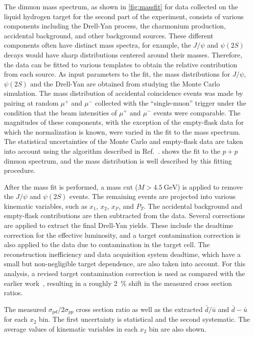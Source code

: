 \documentclass[reprint,aps,unsortedaddress,superscriptaddress,prl,floatfix,showpacs,linenumbers]{revtex4-2}
\begin{document}
The dimuon mass spectrum, as shown in \cref{fig:massfit} for data collected
on the liquid hydrogen target for the second part of the experiment, consists
of various components including the Drell-Yan process, the charmonium
production, accidental background, and other background sources.
These different components often have distinct mass spectra, for example, the $J/\psi$
and $\psi\left(2S\right)$ decays would have sharp distributions centered around their masses.
Therefore, the data can be fitted to various templates to obtain
the relative contribution from each source.
As input parameters to the fit, the mass distributions for $J/\psi$, $\psi\left(2S\right)$
and the Drell-Yan are obtained from studying the Monte Carlo simulation. %
The mass distribution of accidental coincidence events was made by pairing at random $\mu^+$ and $\mu^-$ collected with the ``single-muon'' trigger
under the condition that the beam intensities of $\mu^+$ and $\mu^-$ events were comparable.
The magnitudes of these components,
with the exception of the empty-flask data for which the normalization is known,
were varied in the fit to the mass spectrum.
The statistical uncertainties of the Monte Carlo and empty-flask data are taken into account using the algorithm described in Ref.~\cite{barlow1993}.
 shows the fit to the $p+p$ dimuon spectrum,
and the mass distribution is well described by this fitting procedure.

After the mass fit is performed,
a mass cut ($M>\SI{4.5}{\GeV}$) is applied to remove the $J/\psi$ and $\psi\left(2S\right)$ events.
The remaining events are projected into various kinematic variables, such as $x_1$, $x_2$, $x_F$, and $P_T$.
The accidental background and empty-flask contributions are then subtracted from the data.
Several corrections are applied to extract the final Drell-Yan yields.
These include the deadtime correction for the effective luminosity,
and a target contamination correction is also applied to the  data due to  contamination in the target cell.
The reconstruction inefficiency and data acquisition system deadtime, which have a small but non-negligible target dependence,
are also taken into account.
For this analysis,
a revised target contamination correction is used as compared with the earlier work~\cite{dove2021,dove2023},
resulting in a roughly \SI{2}{\percent} shift in the measured cross section ratios.

\begin{table}[htbp!]
	\centering
	\caption{The measured $\sigma_{pd}/2\sigma_{pp}$ cross section ratio as well
		as the extracted $\bar{d}/\bar{u}$ and $\bar{d}-\bar{u}$ for each $x_{2}$ bin.
		The first uncertainty is statistical and the second systematic.
		The average values of kinematic variables in each $x_2$ bin are also shown.}
	\label{tab:dbarubar}
	\begin{adjustbox}{max width=\textwidth}
		
	\end{adjustbox}
\end{table}
\end{document}
